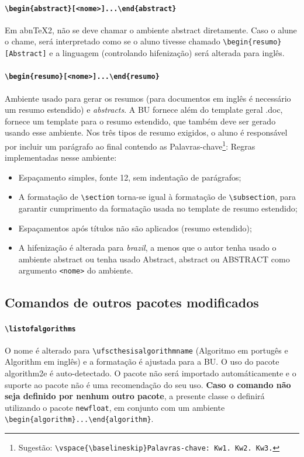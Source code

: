 \documentclass[embeddedlogo]{ufsc-thesis-rn46-2019}
\newcommand{\lacmd}[1]{\texttt{\textbackslash{}#1}}
\newcommand{\laenvi}[2]{\texttt{\textbackslash{}begin\{#1\}[#2]...\textbackslash{}end\{#1\}}}
\begin{document}
\paragraph*{\laenvi{abstract}{<nome>}}
Em abnTeX2, não se deve chamar o ambiente abstract diretamente. Caso o alune o
chame, será interpretado como se o aluno tivesse chamado
\lacmd{begin\{resumo\}[Abstract]} e a linguagem (controlando hifenização) será
alterada para inglês.

\paragraph*{\laenvi{resumo}{<nome>}}
Ambiente usado para gerar os resumos (para documentos em inglês é necessário um
resumo estendido) e \emph{abstracts}. A BU fornece além do template geral .doc,
fornece um template para o resumo estendido, que também deve ser gerado usando
esse ambiente. Nos três tipos de resumo exigidos, o aluno é responsável por
incluir um parágrafo ao final contendo as Palavras-chave\footnote{Sugestão:
  \lacmd{vspace\{\lacmd{baselineskip}\}Palavras-chave: Kw1. Kw2. Kw3.}}: Regras
implementadas nesse ambiente:
\begin{itemize}
\item Espaçamento simples, fonte 12, sem indentação de parágrafos;
\item A formatação de \lacmd{section} torna-se igual à formatação de
  \lacmd{subsection}, para garantir cumprimento da formatação usada no template de
  resumo estendido;
\item Espaçamentos após títulos não são aplicados (resumo estendido);
\item A hifenização é alterada para \textit{brazil}, a menos que o autor tenha
  usado o ambiente abstract ou tenha usado Abstract, abstract ou ABSTRACT como
  argumento \texttt{<nome>} do ambiente.
\end{itemize}

\subsection{Comandos de outros pacotes modificados}

\paragraph*{\lacmd{listofalgorithms}} O nome é alterado para
\lacmd{ufscthesisalgorithmname} (Algoritmo em portugês e Algorithm em inglês) e
a formatação é ajustada para a BU. O uso do pacote algorithm2e é
auto-detectado. O pacote não será importado automáticamente e o suporte ao
pacote não é uma recomendação do seu uso. \textbf{Caso o comando não seja
  definido por nenhum outro pacote}, a presente classe o definirá utilizando o
pacote \texttt{newfloat}, em conjunto com um ambiente
\lacmd{begin\{algorithm\}...\lacmd{end\{algorithm\}}}.
\end{document}
